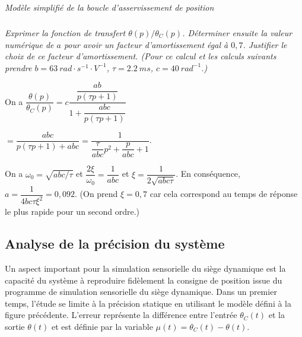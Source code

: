 \documentclass[10pt,fleqn]{article} %
\begin{document}
\begin{multicols}{2}
\begin{center}
\textit{Modèle simplifié de la boucle d'asservissement de
position \label{fig14}}
\end{center}


\subparagraph{}\textit{Exprimer la fonction de transfert $\theta(p)/\theta_C(p)$.
  Déterminer ensuite la valeur numérique de $a$ pour avoir un facteur
  d'amortissement égal à $0,7$. Justifier le choix de ce facteur
  d'amortissement. (Pour ce calcul et les calculs suivants prendre $b =
  \SI{63}{rad\cdot s^{-1}\cdot V^{-1}}$, $\tau= \SI{2,2}{ms}$, $c = \SI{40}{rad^{-1}}$.)}

\ifprof
\begin{corrige}
On a $\dfrac{\theta(p)}{\theta_C(p)}=c\dfrac{\dfrac{ab}{p\left( \tau p + 1\right)}}{1+\dfrac{abc}{p\left( \tau p + 1\right)}}$

$=\dfrac{{abc}}{p\left( \tau p + 1\right)+{abc}}=\dfrac{1}{ \dfrac{\tau}{abc} p^2 + \dfrac{p}{abc}+1}$.

On a $\omega_0 = \sqrt{abc/\tau}$ et $\dfrac{2\xi}{\omega_0}=\dfrac{1}{abc}$ et 
$\xi=\dfrac{1}{2\sqrt{abc\tau}}$. 
En conséquence, ${a}=\dfrac{1}{4bc\tau\xi^2}=0,092$. (On prend $\xi=0,7$ car cela correspond au temps de réponse le plus rapide pour un second ordre.)
\end{corrige}
\else
\fi
  

\subsection*{Analyse de la précision du système}

Un aspect important pour la simulation sensorielle du siège dynamique
est la capacité du système à reproduire fidèlement la consigne de
position issue du programme de simulation sensorielle du siège
dynamique. Dans un premier temps, l'étude se limite à la précision
statique en utilisant le modèle défini à la figure précédente. L'erreur
représente la différence entre l'entrée $\theta_C(t)$ et la
sortie $\theta(t)$ et est définie par la variable $\mu(t) = \theta_C(t)-\theta(t)$.



\end{multicols}
\end{document}
